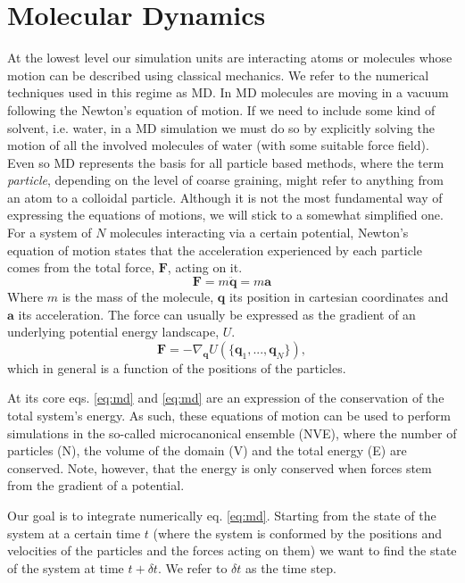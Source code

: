 \documentclass[ twoside,openright,titlepage,numbers=noenddot,%
headinclude,footinclude,cleardoublepage=empty,abstract=on,
BCOR=5mm,paper=a4,fontsize=11pt, dvipsnames
]{scrreprt}
\renewcommand{\vec}[1]{\bm{#1}}
\newcommand{\dt}{\delta t}
\newcommand{\ppos}{q}
\begin{document}
\chapter{Molecular Dynamics}\label{sec:md}

At the lowest level our simulation units are interacting atoms or molecules whose motion can be described using classical mechanics. We refer to the numerical techniques used in this regime as \gls{MD}.
In \gls{MD} molecules are moving in a vacuum following the Newton's equation of motion. If we need to include some kind of solvent, i.e. water, in a \gls{MD} simulation we must do so by explicitly solving the motion of all the involved molecules of water (with some suitable force field).
Even so \gls{MD} represents the basis for all particle based methods, where the term \emph{particle}, depending on the level of coarse graining, might refer to anything from an atom to a colloidal particle.
Although it is not the most fundamental way of expressing the equations of motions, we will stick to a somewhat simplified one. For a system of $N$ molecules interacting via a certain potential, Newton's equation of motion states that the acceleration experienced by each particle comes from the total force, $\vec{F}$, acting on it.
\begin{equation}
  \label{eq:md}
  \vec{F} =  m\ddot{\vec{\ppos}} = m\vec{a}
\end{equation}
Where $m$ is the mass of the molecule, $\vec{\ppos}$ its position in cartesian coordinates and $\vec{a}$ its acceleration.
The force can usually be expressed as the gradient of an underlying potential energy landscape, $U$.
\begin{equation}
  \label{eq:mdfv}
  \vec{F} = -\nabla_{\vec{\ppos}} U(\{\vec{\ppos}_1,...,\vec{\ppos}_N\}),
\end{equation}
which in general is a function of the positions of the particles.


At its core eqs. \eqref{eq:md} and \eqref{eq:md} are an expression of the conservation of the total system's energy. As such, these equations of motion can be used to perform simulations in the so-called microcanonical ensemble (NVE), where the number of particles (N), the volume of the domain (V) and the total energy (E) are conserved. Note, however, that the energy is only conserved when forces stem from the gradient of a potential.


Our goal is to integrate numerically eq. \eqref{eq:md}. Starting from the state of the system at a certain time $t$ (where the system is conformed by the positions and velocities of the particles and the forces acting on them) we want to find the state of the system at time $t + \dt$. We refer to $\dt$ as the time step.
\end{document}
